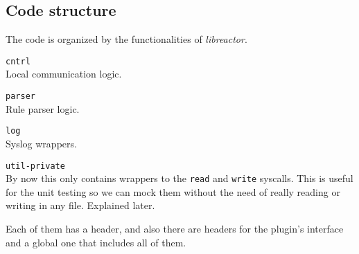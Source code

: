 \subsection{Code structure}
The code is organized by the functionalities of \emph{libreactor}. 
\begin{list}{-}{We have four modules:}
  \item \texttt{cntrl}\\
	  Local communication logic.
  \item \texttt{parser}\\
	  Rule parser logic.
  \item \texttt{log}\\
	  Syslog wrappers.
  \item \texttt{util-private}\\
	  By now this only contains wrappers to the \texttt{read} and \texttt{write} syscalls. This is useful for the unit testing so we 
	  can mock them without the need of really reading or writing in any file. Explained later.
\end{list}
Each of them has a header, and also there are headers for the plugin's interface and a global one that includes all of them.
